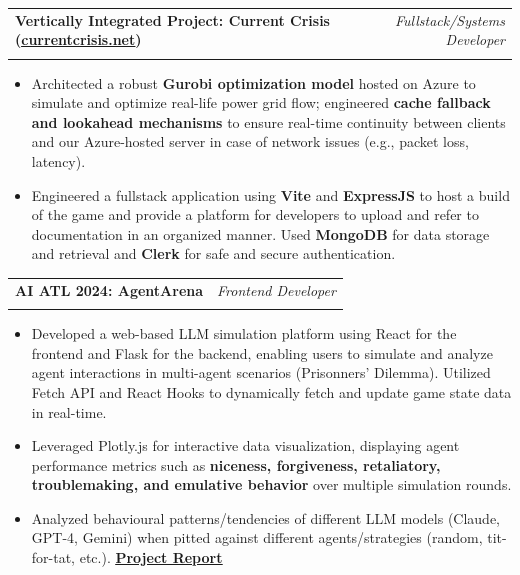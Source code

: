 \documentclass[letterpaper,11pt]{article}
\makeatletter
\newcommand{\resumeItem}[1]{
  \item\small{
    {#1 \vspace{-2pt}}
  }
}
\newcommand{\resumeSubheading}[4]{
  \vspace{-2pt}\item
    \begin{tabular*}{0.97\textwidth}[t]{l@{\extracolsep{\fill}}r}
      \textbf{#1} & #2 \\
      \textit{\small#3} & \textit{\small #4} \\
    \end{tabular*}\vspace{-7pt}
}
\newcommand{\resumeItemListStart}{\begin{itemize}}
\newcommand{\resumeItemListEnd}{\end{itemize}\vspace{-8pt}}
\makeatother
\begin{document}
    \resumeSubheading
    {Vertically Integrated Project: Current Crisis (\href{https://currentcrisis.net}{\underline{currentcrisis.net}})}{\textit{Fullstack/Systems Developer}}
    {}{}
    \resumeItemListStart
    \vspace{-5mm}
      \resumeItem{Architected a robust \textbf{Gurobi optimization model} hosted on Azure to simulate and optimize real-life power grid flow; engineered \textbf{cache fallback and lookahead mechanisms} to ensure real-time continuity between clients and our Azure-hosted server in case of network issues (e.g., packet loss, latency).}
      \resumeItem{Engineered a fullstack application using \textbf{Vite} and \textbf{ExpressJS} to host a build of the game and provide a platform for developers to upload and refer to documentation in an organized manner. Used \textbf{MongoDB} for data storage and retrieval and \textbf{Clerk} for safe and secure authentication.}
    \resumeItemListEnd
    
    \resumeSubheading
    {AI ATL 2024: AgentArena}{\textit{Frontend Developer}}
    {}{}
    \resumeItemListStart
    \vspace{-5mm}
      \resumeItem{Developed a web-based LLM simulation platform using React for the frontend and Flask for the backend, enabling users to simulate and analyze agent interactions in multi-agent scenarios (Prisonners' Dilemma). Utilized Fetch API and React Hooks to dynamically fetch and update game state data in real-time.}
      \resumeItem{Leveraged Plotly.js for interactive data visualization, displaying agent performance metrics such as \textbf{niceness, forgiveness, retaliatory, troublemaking, and emulative behavior} over multiple simulation rounds.}
      \resumeItem{Analyzed behavioural patterns/tendencies of different LLM models (Claude, GPT-4, Gemini) when pitted against different agents/strategies (random, tit-for-tat, etc.). \href{https://drive.google.com/file/d/1SQzdfGt7ht6lkvVI1J9FIJJ_4yjdPMzK/view?usp=sharing}{\textbf{\underline{Project Report}}}}
    \resumeItemListEnd

\end{document}
